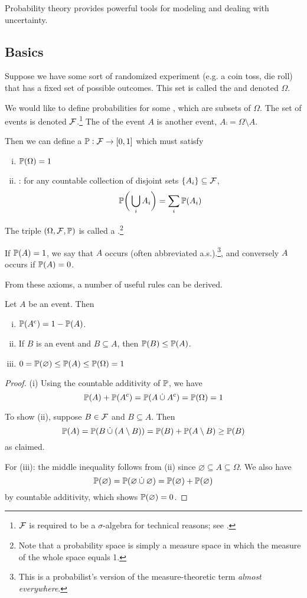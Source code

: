 Probability theory provides powerful tools for modeling and dealing with uncertainty.

\subsection{Basics}
Suppose we have some sort of randomized experiment (e.g. a coin toss, die roll) that has a fixed set of possible outcomes.
This set is called the  and denoted $\Omega$.

We would like to define probabilities for some , which are subsets of $\Omega$.
The set of events is denoted $\calF$.\footnote{
    $\calF$ is required to be a $\sigma$-algebra for technical reasons; see \cite{rigorousprob}.
}
The  of the event $A$ is another event, $A\comp = \Omega \setminus A$.

Then we can define a  $\P : \calF \to [0,1]$ which must satisfy
\begin{enumerate}[(i)]
\item $\pr{\Omega} = 1$
\item {}: for any countable collection of disjoint sets $\{A_i\} \subseteq \calF$,
\[\prbigg{\bigcup_i A_i} = \sum_i \pr{A_i}\]
\end{enumerate}
The triple $(\Omega, \calF, \P)$ is called a .\footnote{
    Note that a probability space is simply a measure space in which the measure of the whole space equals 1.
}

If $\pr{A} = 1$, we say that $A$ occurs  (often abbreviated a.s.).\footnote{
    This is a probabilist's version of the measure-theoretic term \textit{almost everywhere}.
}, and conversely $A$ occurs  if $\pr{A} = 0$.

From these axioms, a number of useful rules can be derived.
\begin{proposition}
Let $A$ be an event. Then
\begin{enumerate}[(i)]
\item $\pr{A\comp} = 1 - \pr{A}$.
\item If $B$ is an event and $B \subseteq A$, then $\pr{B} \leq \pr{A}$.
\item $0 = \pr{\varnothing} \leq \pr{A} \leq \pr{\Omega} = 1$
\end{enumerate}
\end{proposition}
\begin{proof}
(i) Using the countable additivity of $\P$, we have
\[\pr{A} + \pr{A\comp} = \pr{A \dotcup A\comp} = \pr{\Omega} = 1\]

To show (ii), suppose $B \in \calF$ and $B \subseteq A$. Then
\[\pr{A} = \pr{B \dotcup (A \setminus B)} = \pr{B} + \pr{A \setminus B} \geq \pr{B}\]
as claimed.

For (iii): the middle inequality follows from (ii) since $\varnothing \subseteq A \subseteq \Omega$.
We also have
\[\pr{\varnothing} = \pr{\varnothing \dotcup \varnothing} = \pr{\varnothing} + \pr{\varnothing}\]
by countable additivity, which shows $\pr{\varnothing} = 0$.
\end{proof}

